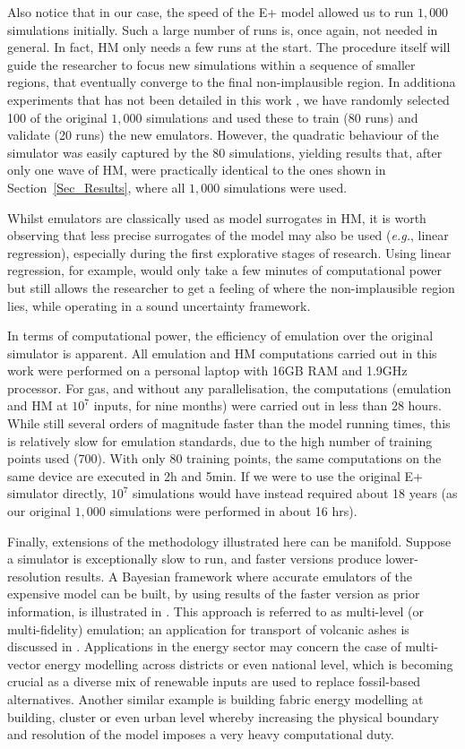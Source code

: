\documentclass[preprint,12pt, sort&compress]{elsarticle}
\begin{document}
Also notice that in our case, the speed of the E+ model allowed us to run $1,000$ simulations initially. Such a large number of runs is, once again, not needed in general. In fact, HM only needs a few runs at the start. The procedure itself will guide the researcher to focus new simulations within a sequence of smaller regions, that eventually converge to the final non-implausible region. In additiona experiments that has not been detailed in this work , we have randomly selected 100 of the original $1,000$ simulations and used these to train (80 runs) and validate (20 runs) the new emulators. However, the quadratic behaviour of the simulator was easily captured by the 80 simulations, yielding results that, after only one wave of HM, were practically identical to the ones shown in Section~\ref{Sec_Results}, where all $1,000$ simulations were used.

Whilst emulators are classically used as model surrogates in HM, it is worth observing that less precise surrogates of the model may also be used (\textit{e.g.}, linear regression), especially during the first explorative stages of research. Using linear regression, for example, would only take a few minutes of computational power but still allows the researcher to get a feeling of where the non-implausible region lies, while operating in a sound uncertainty framework.

In terms of computational power, the efficiency of emulation over the original simulator is apparent. All emulation and HM computations carried out in this work were performed on a personal laptop with 16GB RAM and 1.9GHz processor. For gas, and without any parallelisation, the computations (emulation and HM at $10^7$ inputs, for nine months) were carried out in less than 28 hours. While still several orders of magnitude faster than the model running times, this is relatively slow for emulation standards, due to the high number of training points used (700). With only 80 training points, the same computations on the same device are executed in 2h and 5min. If we were to use the original E+ simulator directly, $10^7$ simulations would have instead required about 18 years (as our original $1,000$ simulations were performed in about 16 hrs).

Finally, extensions of the methodology illustrated here can be manifold. Suppose a simulator is exceptionally slow to run, and faster versions produce lower-resolution results. A Bayesian framework where accurate emulators of the expensive model can be built, by using results of the faster version as prior information, is illustrated in \cite{cumming2009}. This approach is referred to as multi-level (or multi-fidelity) emulation; an application for transport of volcanic ashes is discussed in \cite{harvey2018}. Applications in the energy sector may concern the case of multi-vector energy modelling across districts or even national level, which is becoming crucial as a diverse mix of renewable inputs are used to replace fossil-based alternatives. Another similar example is building fabric energy modelling at building, cluster or even urban level whereby increasing the physical boundary and resolution of the model imposes a very heavy computational duty.   
\end{document}
